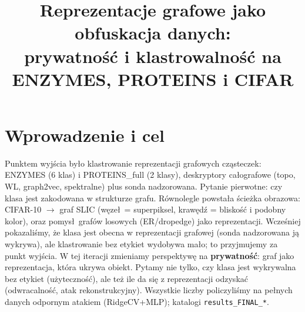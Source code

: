 \documentclass[11pt,a4paper]{article}
\title{\vspace{-1.2cm}Reprezentacje grafowe jako obfuskacja danych:\\
prywatno\'s\'c i klastrowalno\'s\'c na ENZYMES, PROTEINS i CIFAR}
\author{}
\date{}
\begin{document}
\maketitle
\vspace{-1.0cm}

\section{Wprowadzenie i cel}
Punktem wyj\'scia by\l o klastrowanie reprezentacji grafowych cz\k{a}steczek: ENZYMES (6 klas)
i PROTEINS\_full (2 klasy), deskryptory ca\l ografowe (topo, WL, graph2vec, spektralne) plus
sonda nadzorowana. Pytanie pierwotne: czy klasa jest zakodowana w strukturze grafu. R\'ownolegle
powsta\l a \'scie\.zka obrazowa: CIFAR-10 $\to$ graf SLIC (w\k{e}ze\l\ = superpiksel,
kraw\k{e}d\'z = blisko\'s\'c i podobny kolor), oraz pomys\l\ graf\'ow losowych (ER/dropedge)
jako reprezentacji. Wcze\'sniej pokazali\'smy, \.ze klasa jest obecna w reprezentacji grafowej
(sonda nadzorowana j\k{a} wykrywa), ale klastrowanie bez etykiet wydobywa ma\l o; to przyjmujemy
za punkt wyj\'scia. W tej iteracji zmieniamy perspektyw\k{e} na \textbf{prywatno\'s\'c}: graf
jako reprezentacja, kt\'ora ukrywa obiekt. Pytamy nie tylko, czy klasa jest wykrywalna bez
etykiet (u\.zyteczno\'s\'c), ale te\.z ile da si\k{e} z reprezentacji odzyska\'c (odwracalno\'s\'c,
atak rekonstrukcyjny). Wszystkie liczby policzyli\'smy na pe\l nych danych odpornym atakiem
(RidgeCV+MLP); katalogi \texttt{results\_FINAL\_*}.
\end{document}
